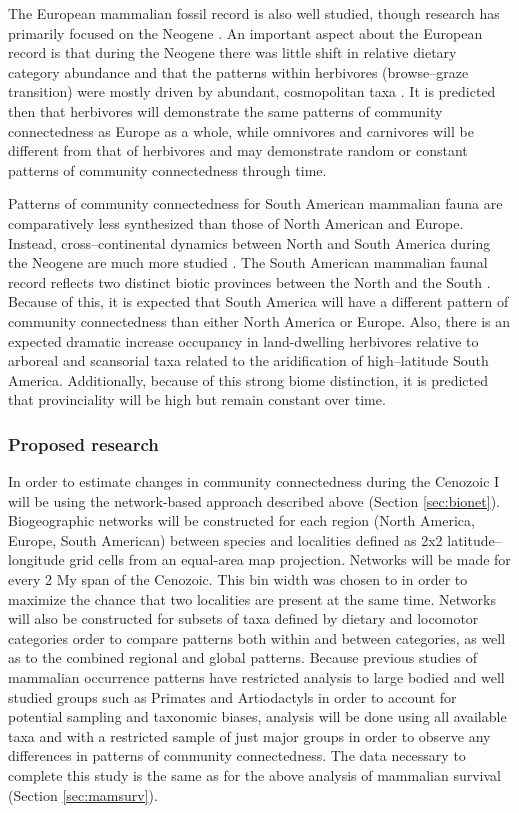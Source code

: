 \documentclass[12pt,letterpaper]{article}
\begin{document}
The European mammalian fossil record is also well studied, though research has primarily focused on the Neogene \citep{Jernvall2002,Jernvall2004,Liow2008,Raia2006,Raia2005,Raia2011c}. An important aspect about the European record is that during the Neogene there was little shift in relative dietary category abundance \citep{Jernvall2004} and that the patterns within herbivores (browse--graze transition) were mostly driven by abundant, cosmopolitan taxa \citep{Jernvall2002}. It is predicted then that herbivores will demonstrate the same patterns of community connectedness as Europe as a whole, while omnivores and carnivores will be different from that of herbivores and may demonstrate random or constant patterns of community connectedness through time. 

Patterns of community connectedness for South American mammalian fauna are comparatively less synthesized than those of North American and Europe. Instead, cross--continental dynamics between North and South America during the Neogene are much more studied \citep{Marshall1982}. The South American mammalian faunal record reflects two distinct biotic provinces between the North and the South \citep{Macfadden1997,Macfadden2006,Flynn1998a,Patterson1968}. Because of this, it is expected that South America will have a different pattern of community connectedness than either North America or Europe. Also, there is an expected dramatic increase occupancy in land-dwelling herbivores relative to arboreal and scansorial taxa related to the aridification of high--latitude South America. Additionally, because of this strong biome distinction, it is predicted that provinciality will be high but remain constant over time. %

\subsubsection{Proposed research} \label{sec:mamcommeth}
In order to estimate changes in community connectedness during the Cenozoic I will be using the network-based approach described above (Section \ref{sec:bionet}). Biogeographic networks will be constructed for each region (North America, Europe, South American) between species and localities defined as 2x2 latitude--longitude grid cells from an equal-area map projection. Networks will be made for every 2 My span of the Cenozoic. This bin width was chosen to in order to maximize the chance that two localities are present at the same time. Networks will also be constructed for subsets of taxa defined by dietary and locomotor categories order to compare patterns both within and between categories, as well as to the combined regional and global patterns. Because previous studies of mammalian occurrence patterns have restricted analysis to large bodied and well studied groups such as Primates and Artiodactyls in order to account for potential sampling and taxonomic biases, analysis will be done using all available taxa and with a restricted sample of just major groups in order to observe any differences in patterns of community connectedness.  The data necessary to complete this study is the same as for the above analysis of mammalian survival (Section \ref{sec:mamsurv}).
\end{document}

